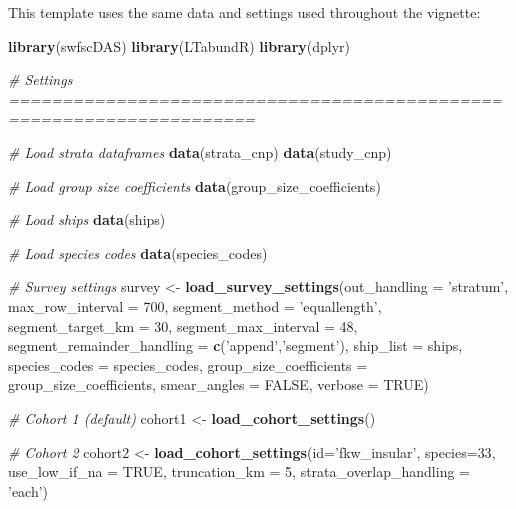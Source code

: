 \documentclass[
]{book}
\newenvironment{Shaded}{\begin{snugshade}}{\end{snugshade}}
\newcommand{\CommentTok}[1]{\textcolor[rgb]{0.56,0.35,0.01}{\textit{#1}}}
\newcommand{\DataTypeTok}[1]{\textcolor[rgb]{0.13,0.29,0.53}{#1}}
\newcommand{\DecValTok}[1]{\textcolor[rgb]{0.00,0.00,0.81}{#1}}
\newcommand{\KeywordTok}[1]{\textcolor[rgb]{0.13,0.29,0.53}{\textbf{#1}}}
\newcommand{\NormalTok}[1]{#1}
\newcommand{\OtherTok}[1]{\textcolor[rgb]{0.56,0.35,0.01}{#1}}
\newcommand{\StringTok}[1]{\textcolor[rgb]{0.31,0.60,0.02}{#1}}
\begin{document}
This template uses the same data and settings used throughout the vignette:

\begin{Shaded}
\begin{Highlighting}[]
\KeywordTok{library}\NormalTok{(swfscDAS)}
\KeywordTok{library}\NormalTok{(LTabundR)}
\KeywordTok{library}\NormalTok{(dplyr)}

\CommentTok{# Settings =====================================================================}

\CommentTok{# Load strata dataframes}
\KeywordTok{data}\NormalTok{(strata_cnp)}
\KeywordTok{data}\NormalTok{(study_cnp)}

\CommentTok{# Load group size coefficients}
\KeywordTok{data}\NormalTok{(group_size_coefficients)}

\CommentTok{# Load ships}
\KeywordTok{data}\NormalTok{(ships)}

\CommentTok{# Load species codes}
\KeywordTok{data}\NormalTok{(species_codes)}

\CommentTok{# Survey settings}
\NormalTok{survey <-}\StringTok{ }
\StringTok{  }\KeywordTok{load_survey_settings}\NormalTok{(}\DataTypeTok{out_handling =} \StringTok{'stratum'}\NormalTok{,}
                       \DataTypeTok{max_row_interval =} \DecValTok{700}\NormalTok{,}
                       \DataTypeTok{segment_method =} \StringTok{'equallength'}\NormalTok{,}
                       \DataTypeTok{segment_target_km =} \DecValTok{30}\NormalTok{,}
                       \DataTypeTok{segment_max_interval =} \DecValTok{48}\NormalTok{,}
                       \DataTypeTok{segment_remainder_handling =} \KeywordTok{c}\NormalTok{(}\StringTok{'append'}\NormalTok{,}\StringTok{'segment'}\NormalTok{),}
                       \DataTypeTok{ship_list =}\NormalTok{ ships,}
                       \DataTypeTok{species_codes =}\NormalTok{ species_codes,}
                       \DataTypeTok{group_size_coefficients =}\NormalTok{ group_size_coefficients,}
                       \DataTypeTok{smear_angles =} \OtherTok{FALSE}\NormalTok{,}
                       \DataTypeTok{verbose =} \OtherTok{TRUE}\NormalTok{)}

\CommentTok{# Cohort 1 (default)}
\NormalTok{cohort1 <-}\StringTok{ }\KeywordTok{load_cohort_settings}\NormalTok{()}

\CommentTok{# Cohort 2}
\NormalTok{cohort2 <-}\StringTok{ }
\StringTok{  }\KeywordTok{load_cohort_settings}\NormalTok{(}\DataTypeTok{id=}\StringTok{'fkw_insular'}\NormalTok{,}
                       \DataTypeTok{species=}\DecValTok{33}\NormalTok{,}
                       \DataTypeTok{use_low_if_na =} \OtherTok{TRUE}\NormalTok{,}
                       \DataTypeTok{truncation_km =} \DecValTok{5}\NormalTok{,}
                       \DataTypeTok{strata_overlap_handling =} \StringTok{'each'}\NormalTok{)}


\end{Highlighting}
\end{Shaded}
\end{document}
